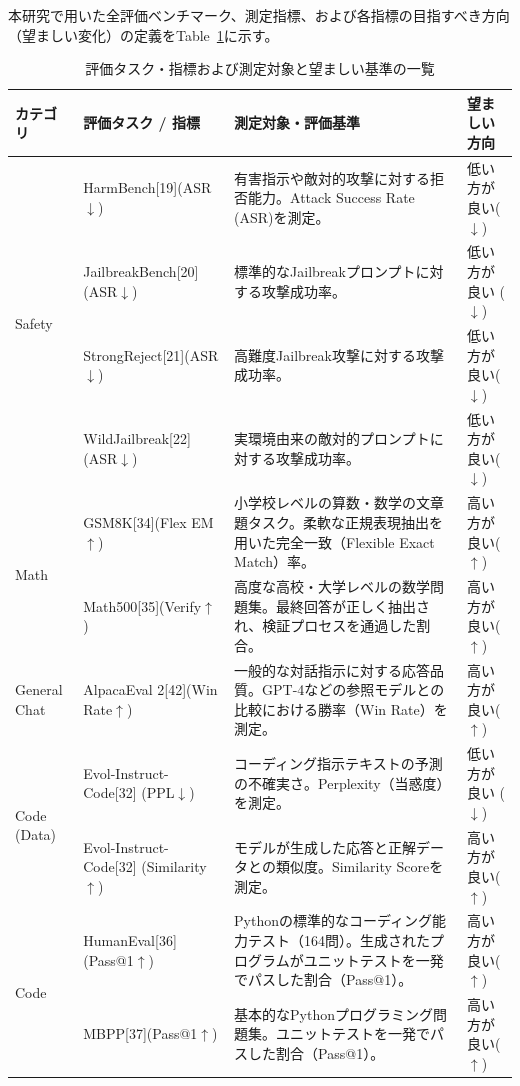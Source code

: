 本研究で用いた全評価ベンチマーク、測定指標、および各指標の目指すべき方向（望ましい変化）の定義をTable~\ref{tab:evaluation_metrics}に示す。
\begin{table}[htbp]
\centering
\caption{評価タスク・指標および測定対象と望ましい基準の一覧}
\label{tab:evaluation_metrics}
\small
\begin{tabularx}{\textwidth}{p{2.0cm}p{3.3cm}Xp{2.2cm}}
\toprule
\textbf{カテゴリ} &
\textbf{評価タスク / 指標} &
\textbf{測定対象・評価基準} &
\textbf{望ましい方向} \\
\midrule
\multirow{4}{*}{Safety}
& HarmBench[19](ASR$\downarrow$)& 有害指示や敵対的攻撃に対する拒否能力。Attack Success Rate (ASR)を測定。 & 低い方が良い($\downarrow$) \\
& JailbreakBench[20](ASR$\downarrow$) & 標準的なJailbreakプロンプトに対する攻撃成功率。& 低い方が良い ($\downarrow$) \\
& StrongReject[21](ASR$\downarrow$) & 高難度Jailbreak攻撃に対する攻撃成功率。 & 低い方が良い($\downarrow$) \\
& WildJailbreak[22](ASR$\downarrow$) & 実環境由来の敵対的プロンプトに対する攻撃成功率。 & 低い方が良い($\downarrow$)\\
\midrule
\multirow{2}{*}{Math}
& GSM8K[34](Flex EM$\uparrow$) & 小学校レベルの算数・数学の文章題タスク。柔軟な正規表現抽出を用いた完全一致（Flexible Exact Match）率。 & 高い方が良い($\uparrow$) \\
& Math500[35](Verify$\uparrow$) & 高度な高校・大学レベルの数学問題集。最終回答が正しく抽出され、検証プロセスを通過した割合。 & 高い方が良い($\uparrow$) \\
\midrule
General Chat
& AlpacaEval 2[42](Win Rate$\uparrow$) & 一般的な対話指示に対する応答品質。GPT-4などの参照モデルとの比較における勝率（Win Rate）を測定。 & 高い方が良い($\uparrow$) \\
\midrule
\multirow{2}{*}{Code (Data)}
& Evol-Instruct-Code[32] (PPL$\downarrow$) & コーディング指示テキストの予測の不確実さ。Perplexity（当惑度）を測定。 & 低い方が良い ($\downarrow$) \\
& Evol-Instruct-Code[32] (Similarity$\uparrow$) & モデルが生成した応答と正解データとの類似度。Similarity Scoreを測定。 & 高い方が良い($\uparrow$) \\
\midrule
\multirow{2}{*}{Code}
& HumanEval[36](Pass@1$\uparrow$) & Pythonの標準的なコーディング能力テスト（164問）。生成されたプログラムがユニットテストを一発でパスした割合（Pass@1）。 & 高い方が良い($\uparrow$) \\
& MBPP[37](Pass@1$\uparrow$) & 基本的なPythonプログラミング問題集。ユニットテストを一発でパスした割合（Pass@1）。 & 高い方が良い($\uparrow$) \\

\end{tabularx}
\end{table}
